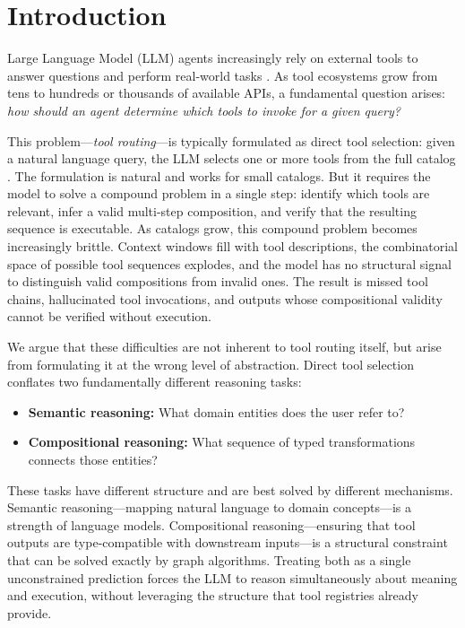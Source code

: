 
\section{Introduction}
\label{sec:introduction}

Large Language Model (LLM) agents increasingly rely on external tools to answer questions and perform real-world tasks \cite{yao2023react, shen2023hugginggpt}.
As tool ecosystems grow from tens to hundreds or thousands of available APIs, a fundamental question arises: \emph{how should an agent determine which tools to invoke for a given query?}

This problem---\emph{tool routing}---is typically formulated as direct tool selection: given a natural language query, the LLM selects one or more tools from the full catalog \cite{li2025toolscope, qin2024toolllm}.
The formulation is natural and works for small catalogs.
But it requires the model to solve a compound problem in a single step: identify which tools are relevant, infer a valid multi-step composition, and verify that the resulting sequence is executable.
As catalogs grow, this compound problem becomes increasingly brittle.
Context windows fill with tool descriptions, the combinatorial space of possible tool sequences explodes, and the model has no structural signal to distinguish valid compositions from invalid ones.
The result is missed tool chains, hallucinated tool invocations, and outputs whose compositional validity cannot be verified without execution.

We argue that these difficulties are not inherent to tool routing itself, but arise from formulating it at the wrong level of abstraction.
Direct tool selection conflates two fundamentally different reasoning tasks:

\begin{itemize}
    \item \textbf{Semantic reasoning:} What domain entities does the user refer to?
    \item \textbf{Compositional reasoning:} What sequence of typed transformations connects those entities?
\end{itemize}

These tasks have different structure and are best solved by different mechanisms.
Semantic reasoning---mapping natural language to domain concepts---is a strength of language models.
Compositional reasoning---ensuring that tool outputs are type-compatible with downstream inputs---is a structural constraint that can be solved exactly by graph algorithms.
Treating both as a single unconstrained prediction forces the LLM to reason simultaneously about meaning and execution, without leveraging the structure that tool registries already provide.

